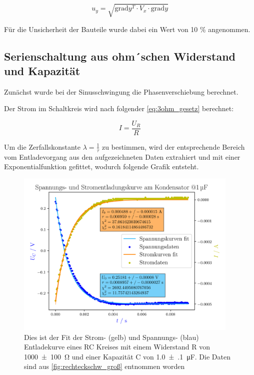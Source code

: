 \documentclass[11pt,ngerman]{scrartcl}
\begin{document}
\begin{equation}
	\label{eq:graduncentainty}
	u_y = \sqrt{\mathrm{grad} y^T \cdot V_x \cdot \mathrm{grad} y}
\end{equation}

Für die Unsicherheit der Bauteile wurde dabei ein Wert von 10 \% angenommen.

\subsection{Serienschaltung aus ohm´schen Widerstand und Kapazität}

Zunächst wurde bei der Sinusschwingung die Phasenverschiebung berechnet.

Der Strom im Schaltkreis wird nach folgender \autoref{eq:3ohm_gesetz} berechnet:

\begin{equation}
	\label{eq:3ohm_gesetz}
	I = \frac{U_R}{R}
\end{equation}

Um die Zerfallskonstante $\lambda = \frac{1}{\tau}$ zu bestimmen, wird der
entsprechende Bereich vom Entladevorgang aus den aufgezeichneten Daten
extrahiert und mit einer Exponentialfunktion gefittet, wodurch folgende Grafik
entsteht.

\begin{figure}[H]
	\begin{center}
		\includegraphics[width=0.95\textwidth]{figures/entladekurve}
	\end{center}
	\caption{Dies ist der Fit der Strom- (gelb) und Spannungs- (blau) Entladekurve eines RC Kreises mit einem
		Widerstand R von \SI{1000(100)}{\ohm} und einer Kapazität C von
		\SI{1.0(1)}{\micro\farad}. Die Daten sind aus \autoref{fig:rechteckschw_groß}
		entnommen worden}
	\label{fig:entladekurve}
\end{figure}
\end{document}
